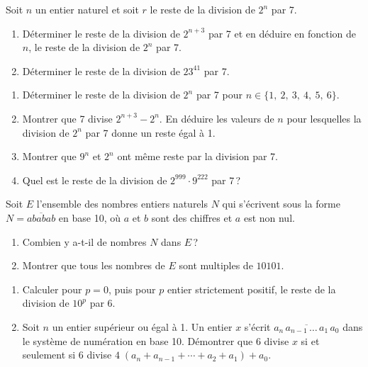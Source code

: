 %
\begin{exo}\label{exo:arith-9}
      Soit $n$ un entier naturel et soit $r$ le reste de la division de $2^n $ par 7.
      \begin{enumerate}
            \item D\'eterminer le reste de la division de $2^{n+3}$ par 7 et en d\'eduire en fonction de $n$, 
                  le reste de la division de $2^n$ par 7.
            \item D\'eterminer le reste de la division de $23^{41}$ par 7.
      \end{enumerate}
\end{exo}
%
\begin{exo}\label{exo:arith-10}
      \begin{enumerate}
            \item D\'eterminer le reste de la division de $2^n$ par 7 pour $n \in \{ 1, \ 2, \ 3, \ 4, \ 5, \ 6 \}$.
            \item Montrer que 7 divise $2^{n+3} - 2^n$. 
                  En d\'eduire les valeurs de $n$ pour lesquelles la division de $2^n$ par 7 donne un reste \'egal \`a 1.
            \item Montrer que $9^n$ et $2^n$ ont m\^eme reste par la division par 7.
            \item Quel est le reste de la division de $2^{999} \cdot 9^{222}$ par 7\,?
      \end{enumerate}
\end{exo}
%
\begin{exo}\label{exo:arith-11}
      Soit $E$ l'ensemble des nombres entiers naturels $N$ qui s'\'ecrivent 
      sous la forme $N = \overline{ababab}$ en base 10, o\`u $a$ et $b$ sont des chiffres et $a$ est non nul.
      \begin{enumerate}
            \item Combien y a-t-il de nombres $N$ dans $E$\,? 
            \item Montrer que tous les nombres de $E$ sont multiples de $10101$.
      \end{enumerate}
\end{exo}
%
\begin{exo}\label{exo:arith-12}
      \begin{enumerate}
            \item Calculer pour $p = 0$, puis pour $p$ entier strictement positif, le reste de la division de $10^p$ par 6.
            \item Soit $n$ un entier sup\'erieur ou \'egal \`a 1. 
                  Un entier $x$ s'\'ecrit $\overline{a_n \, a_{n-1} \, \dots \, a_1 \, a_0} $ 
                  dans le syst\`eme de num\'eration en base 10.
                  D\'emontrer que 6 divise $x$ si et seulement si 6 divise $4 \; (a_n + a_{n-1} + \cdots + a_2 + a_1 ) + a_0$.
      \end{enumerate}
\end{exo}

